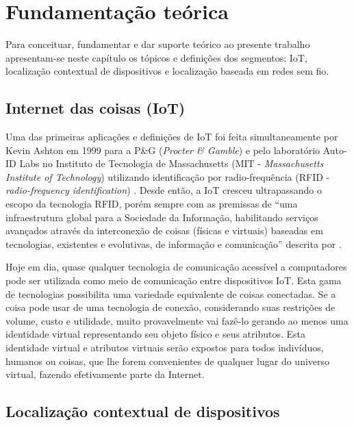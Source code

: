 \chapter{Fundamentação teórica}
\label{chap:Fundamentação teorica}


Para conceituar, fundamentar e dar suporte teórico ao presente trabalho
apresentam-se neste capítulo os tópicos e definições dos segmentos: IoT,
localização contextual de dispositivos e localização baseada em redes sem fio.

\section{Internet das coisas (IoT)}
\label{sec:INTERNET DAS COISAS (IOT)}

Uma das primeiras aplicações e definições de IoT foi feita simultaneamente por
Kevin Ashton em 1999 para a P\&G (\emph{Procter \& Gamble}) \cite{Ashton2009} e
pelo laboratório Auto-ID Labs no Instituto de Tecnologia de Massachusetts (MIT -
\emph{Massachusetts Institute of Technology}) utilizando identificação por
radio-frequência (RFID - \emph{radio-frequency identification})
\cite{ATZORI2010, Friedemann2011}. Desde então, a IoT cresceu ultrapassando o
escopo da tecnologia RFID, porém sempre com as premissas de ``uma infraestrutura
global para a Sociedade da Informação, habilitando serviços avançados através da
interconexão de coisas (físicas e virtuais) baseadas em tecnologias, existentes
e evolutivas, de informação e comunicação'' descrita por .

Hoje em dia, quase qualquer tecnologia de comunicação acessível a computadores
pode ser utilizada como meio de comunicação entre dispositivos IoT. Esta gama de tecnologias possibilita uma
variedade equivalente de coisas conectadas. Se a coisa pode usar de uma
tecnologia de conexão, considerando suas restrições de volume, custo e
utilidade, muito provavelmente vai fazê-lo gerando ao menos uma identidade
virtual representando seu objeto físico e seus atributos. Esta identidade
virtual e atributos virtuais serão expostos para todos indivíduos, humanos ou
coisas, que lhe forem convenientes de qualquer lugar do universo virtual,
fazendo efetivamente parte da Internet.

\section{Localização contextual de dispositivos}
\label{sec:Localização contextual de dispositivos}

